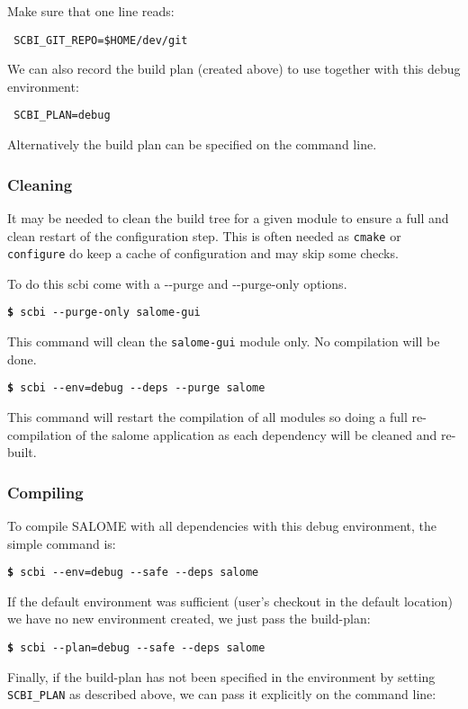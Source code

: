 \documentclass[a4paper,12pt,twoside]{article}
\newcommand{\code}[1]{\texttt{#1}}
\newcommand{\cmd}[1]{\tabto{1cm}\hspace{0.5cm}\texttt{\textbf{\$} #1}}
\newcommand{\ddash}{-{}-}
\begin{document}
Make sure that one line reads:

\begin{lstlisting}
 SCBI_GIT_REPO=$HOME/dev/git
\end{lstlisting}

We can also record the build plan (created above) to use together with this debug environment:

\begin{lstlisting}
 SCBI_PLAN=debug
\end{lstlisting}

Alternatively the build plan can be specified on the command line.

\subsubsection{Cleaning}

It may be needed to clean the build tree for a given module to ensure a full and clean restart of the configuration step. This is often needed as \code{cmake} or \code{configure} do keep a cache of configuration and may skip some checks.

To do this scbi come with a \ddash{}purge and \ddash{}purge-only options.

\cmd{scbi \ddash{}purge-only salome-gui}

This command will clean the \code{salome-gui} module only. No compilation will be done.

\cmd{scbi \ddash{}env=debug \ddash{}deps \ddash{}purge salome}

This command will restart the compilation of all modules so doing a full re-compilation of the salome application as each dependency will be cleaned and re-built.

\subsubsection{Compiling}

To compile SALOME with all dependencies with this debug environment, the simple command is:

\cmd{scbi \ddash{}env=debug \ddash{}safe \ddash{}deps salome}

If the default environment was sufficient (user's checkout in the default location) we have no new environment created, we just pass the build-plan:

\cmd{scbi \ddash{}plan=debug \ddash{}safe \ddash{}deps salome}

Finally, if the build-plan has not been specified in the environment by setting \code{SCBI\_PLAN} as described above, we can pass it explicitly on the command line:
\end{document}

